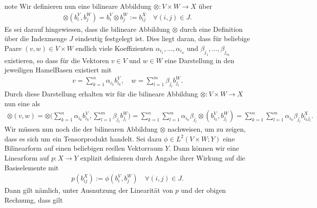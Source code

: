 \documentclass[letterpaper,10pt,english]{jupyterBook}
\begin{document}
\begin{sphinxadmonition}{note}
\sphinxAtStartPar
Wir definieren nun eine bilineare Abbildung \(\otimes: V\times W \to X\) über
\begin{equation*}
\begin{split}\otimes (b_i^V, b_j^W) = b_i^V \otimes b_j^W := b_{ij}^X \quad \forall (i,j)\in J.\end{split}
\end{equation*}
\sphinxAtStartPar
Es sei darauf hingewiesen, dass die bilineare Abbildung \(\otimes\) durch eine Definition über die Indexmenge \(J\) eindeutig festgelegt ist.
Dies liegt daran, dass für beliebige Paare \((v,w)\in V\times W\) endlich viele Koeffizienten \(\alpha_{i_1},\ldots,\alpha_{i_n}\) und \(\beta_{j_1},\ldots, \beta_{j_m}\) existieren, so dass für die Vektoren \(v \in V\) und \(w \in W\) eine Darstellung in den jeweiligen Hamel\sphinxhyphen{}Basen existiert mit
\begin{equation*}
\begin{split}v = \sum_{k=1}^n \alpha_{i_k} b_{i_k}^V, \quad w = \sum_{l=1}^m \beta_{j_l} b_{j_l}^W.\end{split}
\end{equation*}
\sphinxAtStartPar
Durch diese Darstellung erhalten wir für die bilineare Abbildung \(\otimes: V\times W \to X\) nun eine  als
\begin{equation*}
\begin{split}\otimes(v,w) 
= 
\otimes\big(\sum_{k=1}^n \alpha_{i_k} b_{i_k}^V, \sum_{l=1}^m \beta_{j_l} b_{j_l}^W\big) = 
\sum_{k=1}^n \sum_{l=1}^m \alpha_{i_k} \beta_{j_l} \otimes\left(b_{i_k}^V, b_{j_l}^W\right) =
\sum_{k=1}^n \sum_{l=1}^m \alpha_{i_k} \beta_{j_l} b_{i_kj_l}^X.\end{split}
\end{equation*}
\sphinxAtStartPar
Wir müssen nun noch die  der bilinearen Abbildung \(\otimes\) nachweisen, um zu zeigen, dass es sich um ein Tensorprodukt handelt.
Sei dazu \(\phi\in L^2(V\times W; Y)\) eine Bilinearform auf einen beliebigen reellen Vektorraum \(Y\).
Dann können wir eine Linearform auf \(p: X\to Y\) explizit definieren durch Angabe ihrer Wirkung auf die Basiselemente mit
\begin{equation*}
\begin{split}p(b_{ij}^X) := \phi(b_i^V, b_j^W) \quad \forall (i,j) \in J.\end{split}
\end{equation*}
\sphinxAtStartPar
Dann gilt nämlich, unter Ausnutzung der Linearität von \(p\) und der obigen Rechnung, dass gilt

\end{sphinxadmonition}
\end{document}
